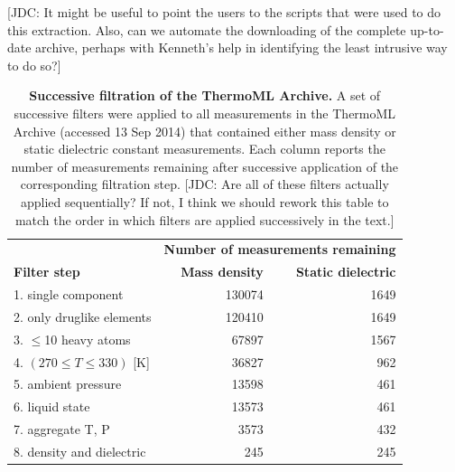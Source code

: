 \documentclass[aps,pre,twocolumn,nofootinbib,superscriptaddress,linenumbers]{revtex4-1}
\begin{document}
{\color{red}[JDC: It might be useful to point the users to the scripts that were used to do this extraction.
Also, can we automate the downloading of the complete up-to-date archive, perhaps with Kenneth's help in identifying the least intrusive way to do so?]}


\begin{table}
\begin{tabular}{lrr}
\hline
 &  \multicolumn{2}{c}{\bf Number of measurements remaining} \\ \cline{2-3}
{\bf Filter step} &  {\bf Mass density} &  {\bf Static dielectric} \\ 
\hline
1.  single component   &               130074 &                                     1649 \\
2.  only druglike elements  &               120410 &                                     1649 \\
3.  $\le$10 heavy atoms        &                67897 &                                     1567 \\
4.  $(270 \le T \le 330)$ [K]  &                36827 &                                      962 \\
5.  ambient pressure           &                13598 &                                      461 \\
6.  liquid state       &                13573 &                                      461 \\
7.  aggregate T, P     &                 3573 &                                      432 \\
8.  density and dielectric &                  245 &                                      245 \\
\hline
\end{tabular}
\caption{{\bf Successive filtration of the ThermoML Archive.}
A set of successive filters were applied to all measurements in the ThermoML Archive (accessed 13 Sep 2014) that contained either mass density or static dielectric constant measurements.
Each column reports the number of measurements remaining after successive application of the corresponding filtration step.
{\color{red}[JDC: Are all of these filters actually applied sequentially?  If not, I think we should rework this table to match the order in which filters are applied successively in the text.]}
}
\label{table:ThermoMLSummary}
\end{table}
\end{document}
